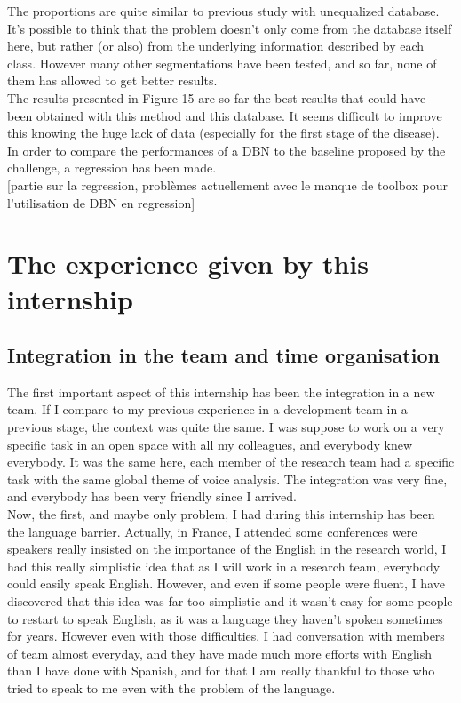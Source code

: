 \documentclass{report}
\begin{document}
		 
		 The proportions are quite similar to previous study with unequalized database. It's possible to think that the problem doesn't only come from the database itself here, but rather (or also) from the underlying information described by each class. However many other segmentations have been tested, and so far, none of them has allowed to get better results. \\
		 
		 The results presented in Figure 15 are so far the best results that could have been obtained with this method and this database. It seems difficult to improve this knowing the huge lack of data (especially for the first stage of the disease). In order to compare the performances of a DBN to the baseline proposed by the challenge, a regression has been made.\\
		 
		 [partie sur la regression, problèmes actuellement avec le manque de toolbox pour l'utilisation de DBN en regression]
		 		 		
	\chapter{The experience given by this internship}
	
		\section{Integration in the team and time organisation}
		
		The first important aspect of this internship has been the integration in a new team. If I compare to my previous experience in a development team in a previous stage, the context was quite the same. I was suppose to work on a very specific task in an open space with all my colleagues, and everybody knew everybody. It was the same here, each member of the research team had a specific task with the same global theme of voice analysis. The integration was very fine, and everybody has been very friendly since I arrived.\\
		
		Now, the first, and maybe only problem, I had during this internship has been the language barrier. Actually, in France, I attended some conferences were speakers really insisted on the importance of the English in the research world, I had this really simplistic idea that as I will work in a research team, everybody could easily speak English. However, and even if some people were fluent, I have discovered that this idea was far too simplistic and it wasn't easy for some people to restart to speak English, as it was a language they haven't spoken sometimes for years. However even with those difficulties, I had conversation with members of team almost everyday, and they have made much more efforts with English than I have done with Spanish, and for that I am really thankful to those who tried to speak to me even with the problem of the language.\\
		
\end{document}
